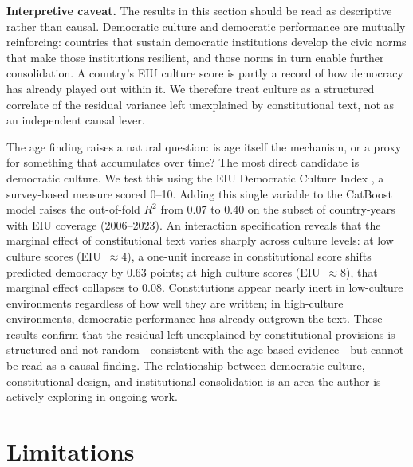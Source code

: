 \documentclass[9pt,twoside]{pnas-new}
\begin{document}
\textbf{Interpretive caveat.} The results in this section should be read as descriptive rather than causal. Democratic culture and democratic performance are mutually reinforcing: countries that sustain democratic institutions develop the civic norms that make those institutions resilient, and those norms in turn enable further consolidation. A country's EIU culture score is partly a record of how democracy has already played out within it. We therefore treat culture as a structured correlate of the residual variance left unexplained by constitutional text, not as an independent causal lever.

The age finding raises a natural question: is age itself the mechanism, or a proxy for something that accumulates over time? The most direct candidate is democratic culture. We test this using the EIU Democratic Culture Index \cite{eiu_democracy_index}, a survey-based measure scored 0--10. Adding this single variable to the CatBoost model raises the out-of-fold $R^2$ from $0.07$ to $0.40$ on the subset of country-years with EIU coverage (2006--2023). An interaction specification reveals that the marginal effect of constitutional text varies sharply across culture levels: at low culture scores (EIU~$\approx 4$), a one-unit increase in constitutional score shifts predicted democracy by $0.63$ points; at high culture scores (EIU~$\approx 8$), that marginal effect collapses to $0.08$. Constitutions appear nearly inert in low-culture environments regardless of how well they are written; in high-culture environments, democratic performance has already outgrown the text. These results confirm that the residual left unexplained by constitutional provisions is structured and not random---consistent with the age-based evidence---but cannot be read as a causal finding. The relationship between democratic culture, constitutional design, and institutional consolidation is an area the author is actively exploring in ongoing work.

\section*{Limitations}
\end{document}
